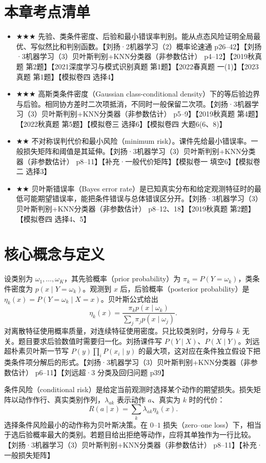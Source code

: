 \documentclass[UTF8,a4paper,zihao=-4,fontset=fandol]{ctexrep}
\begin{document}
\section{本章考点清单}
\begin{itemize}
\item \ensuremath{\bigstar\bigstar\bigstar} 先验、类条件密度、后验和最小错误率判别。能从点态风险证明全局最优、写似然比和判别函数。【刘扬·2机器学习（2）概率论速通 p26–42】【刘扬·3机器学习（3）贝叶斯判别+KNN分类器（非参数估计） p4–12】【2019秋真题 第2题】【2021深度学习与模式识别真题 第1题】【2022春真题 一(1)】【2023真题 第1题】【模拟卷四 选择4】
\item \ensuremath{\bigstar\bigstar\bigstar} 高斯类条件密度（Gaussian class-conditional density）下的等后验边界与后验。相同协方差时二次项抵消，不同时一般保留二次项。【刘扬·3机器学习（3）贝叶斯判别+KNN分类器（非参数估计） p5–9】【2019秋真题 第4题】【2022秋真题 第5题】【模拟卷三 选择6】【模拟卷四 大题6(6、8)】
\item \ensuremath{\bigstar\bigstar} 不对称误判代价和最小风险（minimum risk）。课件先给最小错误率。一般损失矩阵和阈值是其延伸。【刘扬·3机器学习（3）贝叶斯判别+KNN分类器（非参数估计） p8–11】【补充·一般代价矩阵】【模拟卷一 填空6】【模拟卷二 选择3】
\item \ensuremath{\bigstar\bigstar} 贝叶斯错误率（Bayes error rate）是已知真实分布和给定观测特征时的最低可能期望错误率，能把条件错误与总体错误区分开。【刘扬·3机器学习（3）贝叶斯判别+KNN分类器（非参数估计） p8–12、18】【2019秋真题 第2题】【模拟卷四 选择4、5】
\end{itemize}

\section{核心概念与定义}
设类别为 $\omega_1,\ldots,\omega_K$，其先验概率（prior probability）为 $\pi_k=P(Y=\omega_k)$，类条件密度为 $p(x\mid Y=\omega_k)$。观测到 $x$ 后，后验概率（posterior probability）是 $\eta_k(x)=P(Y=\omega_k\mid X=x)$。贝叶斯公式给出
\[
 \eta_k(x)=\frac{\pi_k p(x\mid\omega_k)}
                  {\sum_j\pi_j p(x\mid\omega_j)}.
\]
对离散特征使用概率质量，对连续特征使用密度。只比较类别时，分母与 $k$ 无关。题目要求后验数值时需要归一化。刘扬课件写 $P(Y\mid X)$、$P(X\mid Y)$。刘远超朴素贝叶斯一节写 $P(y)\prod_iP(x_i\mid y)$ 的最大项，这对应在条件独立假设下把类条件项分解后的形式。【刘扬·3机器学习（3）贝叶斯判别+KNN分类器（非参数估计） p6–11】【刘远超·3 分类及回归问题 p39】

条件风险（conditional risk）是给定当前观测时选择某个动作的期望损失。损失矩阵以动作作行、真实类别作列，$\lambda_{ak}$ 表示动作 $a$、真实为 $k$ 时的代价：
\[
 R(a\mid x)=\sum_k\lambda_{ak}\eta_k(x).
\]
选择条件风险最小的动作称为贝叶斯决策。在 $0$--$1$ 损失（zero–one loss）下，相当于选后验概率最大的类别。若题目给出拒绝等动作，应将其单独作为一行比较。【刘扬·3机器学习（3）贝叶斯判别+KNN分类器（非参数估计） p8–11】【补充·一般损失矩阵】
\end{document}
